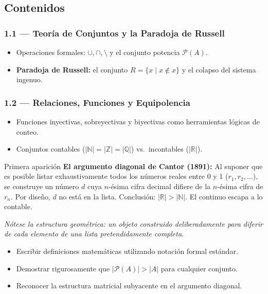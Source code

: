 \documentclass[11pt, letterpaper]{article}
\begin{document}
\subsection{Contenidos}

\subsubsection{1.1 --- Teor\'ia de Conjuntos y la Paradoja de Russell}
\begin{itemize}
  \item Operaciones formales: $\cup, \cap, \setminus$ y el conjunto potencia $\mathcal{P}(A)$.
  \item \textbf{Paradoja de Russell:} el conjunto $R=\{x \mid x\notin x\}$ y el colapso del sistema ingenuo.
\end{itemize}

\subsubsection{1.2 --- Relaciones, Funciones y Equipolencia}
\begin{itemize}
  \item Funciones inyectivas, sobreyectivas y biyectivas como herramientas l\'ogicas de conteo.
  \item Conjuntos contables ($|\mathbb{N}|=|\mathbb{Z}|=|\mathbb{Q}|$) vs.\ incontables ($|\mathbb{R}|$).
\end{itemize}

\begin{diagonal}{Primera aparici\'on}
\textbf{El argumento diagonal de Cantor (1891):} Al suponer que es posible listar exhaustivamente todos los n\'umeros reales entre 0 y 1 ($r_1, r_2, \ldots$), se construye un n\'umero $d$ cuya $n$-\'esima cifra decimal difiere de la $n$-\'esima cifra de $r_n$. Por dise\~no, $d$ no est\'a en la lista. Conclusi\'on: $|\mathbb{R}|>|\mathbb{N}|$. El continuo escapa a lo contable.

\medskip
\textit{N\'otese la estructura geom\'etrica: un objeto construido deliberadamente para diferir de cada elemento de una lista pretendidamente completa.}
\end{diagonal}

\begin{objetivos}
\begin{itemize}
  \item Escribir definiciones matem\'aticas utilizando notaci\'on formal est\'andar.
  \item Demostrar rigurosamente que $|\mathcal{P}(A)|>|A|$ para cualquier conjunto.
  \item Reconocer la estructura matricial subyacente en el argumento diagonal.
\end{itemize}
\end{objetivos}
\end{document}
